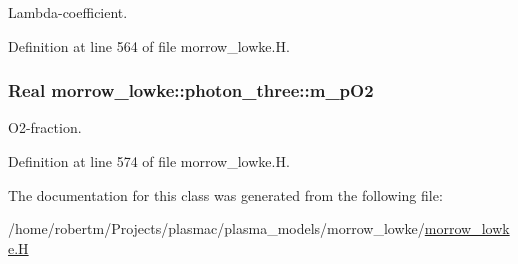 Lambda-\/coefficient. 



Definition at line 564 of file morrow\+\_\+lowke.\+H.

\subsubsection[{\texorpdfstring{m\+\_\+p\+O2}{m_pO2}}]{\setlength{\rightskip}{0pt plus 5cm}Real morrow\+\_\+lowke\+::photon\+\_\+three\+::m\+\_\+p\+O2\hspace{0.3cm}{\ttfamily [protected]}}\hypertarget{classmorrow__lowke_1_1photon__three_a0883bd853c5a7c7c84dee7246af073e2}{}\label{classmorrow__lowke_1_1photon__three_a0883bd853c5a7c7c84dee7246af073e2}


O2-\/fraction. 



Definition at line 574 of file morrow\+\_\+lowke.\+H.



The documentation for this class was generated from the following file\+:\begin{DoxyCompactItemize}
\item 
/home/robertm/\+Projects/plasmac/plasma\+\_\+models/morrow\+\_\+lowke/\hyperlink{morrow__lowke_8H}{morrow\+\_\+lowke.\+H}\end{DoxyCompactItemize}
